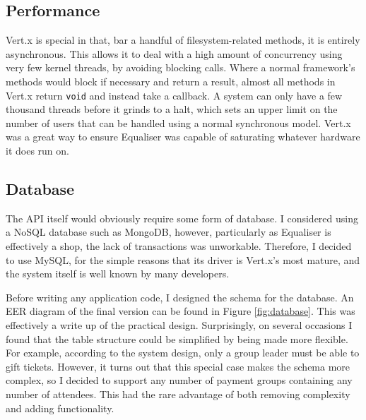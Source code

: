 \documentclass[12pt,a4paper]{bhamdissertation}
\newcommand{\code}[1]{\texttt{#1}}
\begin{document}
\subsection{Performance}

Vert.x is special in that, bar a handful of filesystem-related methods, it is entirely asynchronous. This allows it to deal with a high amount of concurrency using very few kernel threads, by avoiding blocking calls. Where a normal framework's methods would block if necessary and return a result, almost all methods in Vert.x return \code{void} and instead take a callback. A system can only have a few thousand threads before it grinds to a halt, which sets an upper limit on the number of users that can be handled using a normal synchronous model. Vert.x was a great way to ensure Equaliser was capable of saturating whatever hardware it does run on.

\subsection{Database}

The API itself would obviously require some form of database. I considered using a NoSQL database such as MongoDB, however, particularly as Equaliser is effectively a shop, the lack of transactions was unworkable. Therefore, I decided to use MySQL, for the simple reasons that its driver is Vert.x's most mature, and the system itself is well known by many developers.

Before writing any application code, I designed the schema for the database. An EER diagram of the final version can be found in Figure \ref{fig:database}. This was effectively a write up of the practical design. Surprisingly, on several occasions I found that the table structure could be simplified by being made more flexible. For example, according to the system design, only a group leader must be able to gift tickets. However, it turns out that this special case makes the schema more complex, so I decided to support any number of payment groups containing any number of attendees. This had the rare advantage of both removing complexity and adding functionality.
\end{document}
